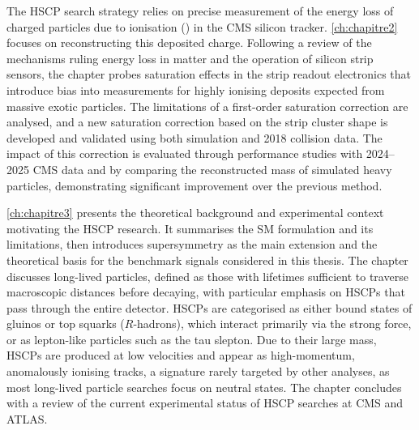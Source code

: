 The HSCP search strategy relies on precise measurement of the energy loss of charged particles due to ionisation (\dedx) in the CMS silicon tracker. \cref{ch:chapitre2} focuses on reconstructing this deposited charge. Following a review of the mechanisms ruling energy loss in matter and the operation of silicon strip sensors, the chapter probes saturation effects in the strip readout electronics that introduce bias into \dedx{} measurements for highly ionising deposits expected from massive exotic particles. The limitations of a first-order saturation correction are analysed, and a new saturation correction based on the strip cluster shape is developed and validated using both simulation and 2018 collision data. The impact of this correction is evaluated through \dedx{} performance studies with 2024–2025 CMS data and by comparing the reconstructed mass of simulated heavy particles, demonstrating significant improvement over the previous method.

\vspace{0.5 cm}

\cref{ch:chapitre3} presents the theoretical background and experimental context motivating the HSCP research. It summarises the SM formulation and its limitations, then introduces supersymmetry as the main extension and the theoretical basis for the benchmark signals considered in this thesis. The chapter discusses long-lived particles, defined as those with lifetimes sufficient to traverse macroscopic distances before decaying, with particular emphasis on HSCPs that pass through the entire detector. HSCPs are categorised as either bound states of gluinos or top squarks ($R$-hadrons), which interact primarily via the strong force, or as lepton-like particles such as the tau slepton. Due to their large mass, HSCPs are produced at low velocities and appear as high-momentum, anomalously ionising tracks, a signature rarely targeted by other analyses, as most long-lived particle searches focus on neutral states. The chapter concludes with a review of the current experimental status of HSCP searches at CMS and ATLAS.

\vspace{0.5 cm}

